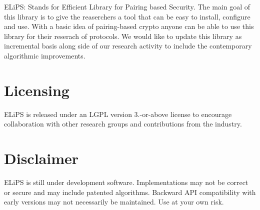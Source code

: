 E\+Li\+PS\+: Stands for Efficient Library for Pairing based Security. The main goal of this library is to give the reaserchers a tool that can be easy to install, configure and use. With a basic idea of pairing-\/based crypto anyone can be able to use this library for their reserach of protocols. We would like to update this library as incremental basis along side of our research activity to include the contemporary algorithmic improvements.\hypertarget{index_Licensing}{}\section{Licensing}\label{index_Licensing}
E\+Li\+PS is released under an L\+G\+PL version 3.-\/or-\/above license to encourage collaboration with other research groups and contributions from the industry.\hypertarget{index_Disclaimer}{}\section{Disclaimer}\label{index_Disclaimer}
E\+Li\+PS is still under development software. Implementations may not be correct or secure and may include patented algorithms. Backward A\+PI compatibility with early versions may not necessarily be maintained. Use at your own risk. 